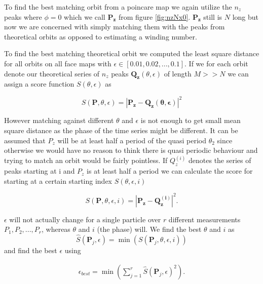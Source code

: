 \label{sec:matchorbit}
To find the best matching orbit from a poincare map we again utilize the $n_z$ peaks where $\phi = 0$ which we call $\mathbf{P_z}$ from figure \ref{fig:nzNx0}. $\mathbf{P_z}$ still is $N$ long but now we are concerned with simply matching them with the peaks from theoretical orbits as opposed to estimating a winding number.


To find the best matching theoretical orbit we computed the least square distance for all orbits on all face maps with $\epsilon \in [0.01, 0.02, ..., 0.1]$. If we for each orbit denote our theoretical series of $n_z$ peaks $\mathbf{Q_z}(\theta, \epsilon)$ of length $M >> N$ we can assign a score function $S(\theta, \epsilon)$ as

\begin{equation}
S(\mathbf{P}, \theta, \epsilon) = \left| \mathbf{P_z} - \mathbf{Q_z(\theta, \epsilon)} \right|^2
\end{equation}

However matching against different $\theta$ and $\epsilon$ is not enough to get small mean square distance as the phase 
of the time series might be different. It can be assumed that $P_z$ will be at least half a period of the quasi period 
$\theta_2$ since otherwise we would have no reason to think there is quasi periodic behaviour and trying to match an 
orbit would be fairly pointless. If $Q_z^{(i)}$ denotes the series of peaks starting at i and  $P_z$ is at 
least half a period we can calculate the score for starting at a certain starting index $S(\theta, \epsilon, i)$

\begin{equation}
S(\mathbf{P}, \theta, \epsilon, i) = \left| \mathbf{P_z} - \mathbf{Q_z^{(i)}} \right|^2.
\end{equation}

$\epsilon$ will not actually change for a single particle over $r$ different measurements $P_1, P_2, ..., P_r$, whereas $\theta$ and $i$ (the phase) will. We find the best $\theta$ and $i$ as
\begin{equation}
\hat{S}(\mathbf{P}_j, \epsilon) =  \min(S(\mathbf{P}_j, \theta, \epsilon, i))
\end{equation}
and find the best $\epsilon$ using

\begin{eqnarray}
\epsilon_{best} = \min(\sum\limits_{j=1}^{r} \hat{S}(\mathbf{P}_j, \epsilon)^2).
\end{eqnarray}

